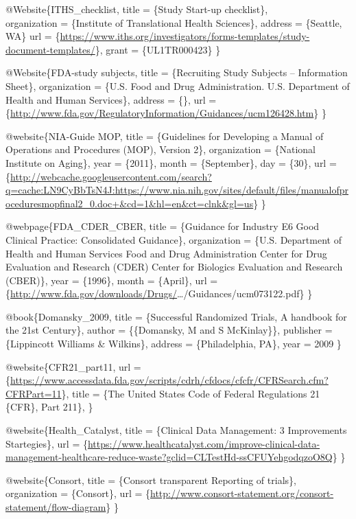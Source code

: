 \documentclass[]{book}
\theoremstyle{definition}
\theoremstyle{definition}
\theoremstyle{definition}
\theoremstyle{remark}
\begin{document}
@Website\{ITHS\_checklist, title = \{Study Start-up checklist\},\\
organization = \{Institute of Translational Health Sciences\}, address =
\{Seattle, WA\} url =
\{\url{https://www.iths.org/investigators/forms-templates/study-document-templates/}\},
grant = \{UL1TR000423\} \}

@Website\{FDA-study subjects, title = \{Recruiting Study Subjects --
Information Sheet\}, organization = \{U.S. Food and Drug Administration.
U.S. Department of Health and Human Services\}, address = \{\}, url =
\{\url{http://www.fda.gov/RegulatoryInformation/Guidances/ucm126428.htm}\}
\}

@website\{NIA-Guide MOP, title = \{Guidelines for Developing a Manual of
Operations and Procedures (MOP), Version 2\}, organization = \{National
Institute on Aging\}, year = \{2011\}, month = \{September\}, day =
\{30\}, url =
\{\url{http://webcache.googleusercontent.com/search?q=cache:LN9CyBbTsN4J:https://www.nia.nih.gov/sites/default/files/manualofproceduresmopfinal2_0.doc+\&cd=1\&hl=en\&ct=clnk\&gl=us}\}
\}

@webpage\{FDA\_CDER\_CBER, title = \{Guidance for Industry E6 Good
Clinical Practice: Consolidated Guidance\}, organization = \{U.S.
Department of Health and Human Services Food and Drug Administration
Center for Drug Evaluation and Research (CDER) Center for Biologics
Evaluation and Research (CBER)\}, year = \{1996\}, month = \{April\},
url =
\{\url{http://www.fda.gov/downloads/Drugs/}\ldots{}/Guidances/ucm073122.pdf\}
\}

@book\{Domansky\_2009, title = \{Successful Randomized Trials, A
handbook for the 21st Century\}, author = \{\{Domansky, M and S
McKinlay\}\}, publisher = \{Lippincott Williams \& Wilkins\}, address =
\{Philadelphia, PA\}, year = 2009 \}

@website\{CFR21\_part11, url =
\{\url{https://www.accessdata.fda.gov/scripts/cdrh/cfdocs/cfcfr/CFRSearch.cfm?CFRPart=11}\},
title = \{The United States Code of Federal Regulations 21 \{CFR\}, Part
211\}, \}

@website\{Health\_Catalyst, title = \{Clinical Data Management: 3
Improvements Startegies\}, url =
\{\url{https://www.healthcatalyst.com/improve-clinical-data-management-healthcare-reduce-waste?gclid=CLTestHd-ssCFUYehgodqzoO8Q}\}
\}

@website\{Consort, title = \{Consort transparent Reporting of trials\},
organization = \{Consort\}, url =
\{\url{http://www.consort-statement.org/consort-statement/flow-diagram}\}
\}
\end{document}
